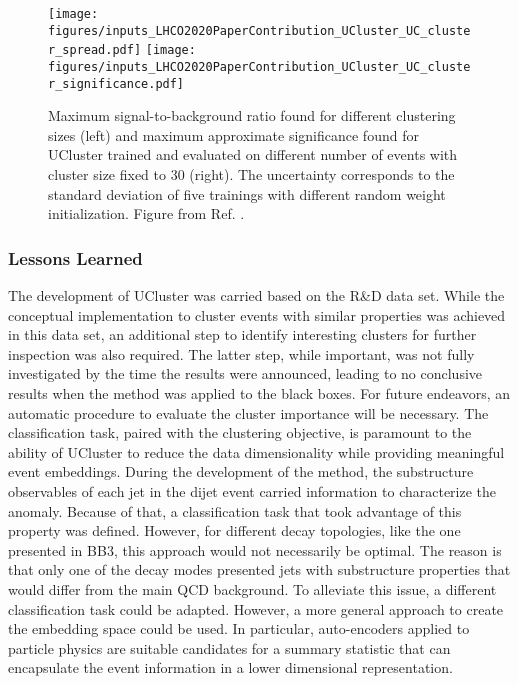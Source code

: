 \documentclass[a4paper,11pt]{article}
\begin{document}
\begin{figure}[h!]
    \centering
    \texttt{[image: figures/inputs\_LHCO2020PaperContribution\_UCluster\_UC\_cluster\_spread.pdf]}
    \texttt{[image: figures/inputs\_LHCO2020PaperContribution\_UCluster\_UC\_cluster\_significance.pdf]}
    \caption{Maximum signal-to-background ratio found for different clustering sizes (left) and maximum approximate significance found for UCluster trained and evaluated on different number of events with cluster size fixed to 30 (right). The uncertainty corresponds to the standard deviation of five trainings with different random weight initialization. Figure from Ref. \cite{Mikuni:2020qds}.}
    \label{fig:anomaly_sig}
\end{figure}


\subsubsection{Lessons Learned}
\label{sec:lessons}
The development of UCluster was carried based on the  R\&D data set. While the conceptual implementation to cluster events with similar properties was achieved in this data set, an additional step to identify interesting clusters for further inspection was also required. The latter step, while important, was not fully investigated by the time the results were announced, leading to no conclusive results when the method was applied to the black boxes. For future endeavors, an automatic procedure to evaluate the cluster importance will be necessary. The classification task, paired with the clustering objective, is paramount to the ability of UCluster to reduce the data dimensionality while providing meaningful event embeddings. During the development of the method, the substructure observables of each jet in the dijet event carried information to characterize the anomaly. Because of that, a classification task that took advantage of this property was defined. However, for different decay topologies, like the one presented in BB3, this approach would not necessarily be optimal. The reason is that only one of the decay modes presented jets with substructure properties that would differ from the main QCD background. To alleviate this issue, a different classification task could be adapted. However, a more general approach to create the embedding space could be used. In particular, auto-encoders applied to particle physics are suitable candidates for a summary statistic that can encapsulate the event information in a lower dimensional representation.
\end{document}

